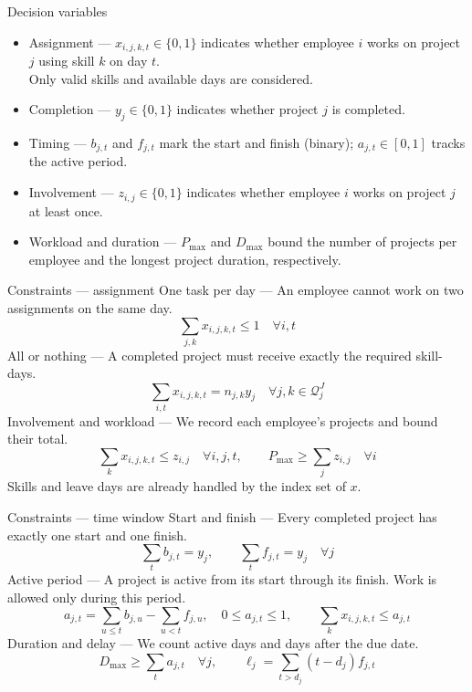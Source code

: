 \documentclass[aspectratio=169,11pt]{beamer}
\begin{document}
\begin{frame}{Decision variables}
\begin{itemize}\setlength{\itemsep}{0.65em}
  \item \alert{Assignment} --- $x_{i,j,k,t}\in\{0,1\}$ indicates whether employee $i$ works on project $j$ using skill $k$ on day $t$.\\
  {\small Only valid skills and available days are considered.}
  \item \alert{Completion} --- $y_j\in\{0,1\}$ indicates whether project $j$ is completed.
  \item \alert{Timing} --- $b_{j,t}$ and $f_{j,t}$ mark the start and finish (binary); $a_{j,t}\in[0,1]$ tracks the active period.
  \item \alert{Involvement} --- $z_{i,j}\in\{0,1\}$ indicates whether employee $i$ works on project $j$ at least once.
  \item \alert{Workload and duration} --- $P_{\max}$ and $D_{\max}$ bound the number of projects per employee and the longest project duration, respectively.
\end{itemize}
\end{frame}

\begin{frame}{Constraints --- assignment}
\small
\alert{One task per day} --- An employee cannot work on two assignments on the same day.
\[\sum_{j,k}x_{i,j,k,t}\le1\quad\forall i,t\]
\alert{All or nothing} --- A completed project must receive exactly the required skill-days.
\[\sum_{i,t}x_{i,j,k,t}=n_{j,k}y_j\quad\forall j,k\in\mathcal Q_j^J\]
\alert{Involvement and workload} --- We record each employee's projects and bound their total.
\[\sum_k x_{i,j,k,t}\le z_{i,j}\quad\forall i,j,t,\qquad P_{\max}\ge\sum_j z_{i,j}\quad\forall i\]
Skills and leave days are already handled by the index set of $x$.
\end{frame}

\begin{frame}{Constraints --- time window}
\small
\alert{Start and finish} --- Every completed project has exactly one start and one finish.
\[\sum_t b_{j,t}=y_j,\qquad \sum_t f_{j,t}=y_j\quad\forall j\]
\alert{Active period} --- A project is active from its start through its finish. Work is allowed only during this period.
\[a_{j,t}=\sum_{u\le t}b_{j,u}-\sum_{u<t}f_{j,u},\quad 0\le a_{j,t}\le1,\qquad \sum_k x_{i,j,k,t}\le a_{j,t}\]
\alert{Duration and delay} --- We count active days and days after the due date.
\[D_{\max}\ge\sum_t a_{j,t}\quad\forall j,\qquad \ell_j=\sum_{t>d_j}(t-d_j)f_{j,t}\]
\end{frame}
\end{document}
